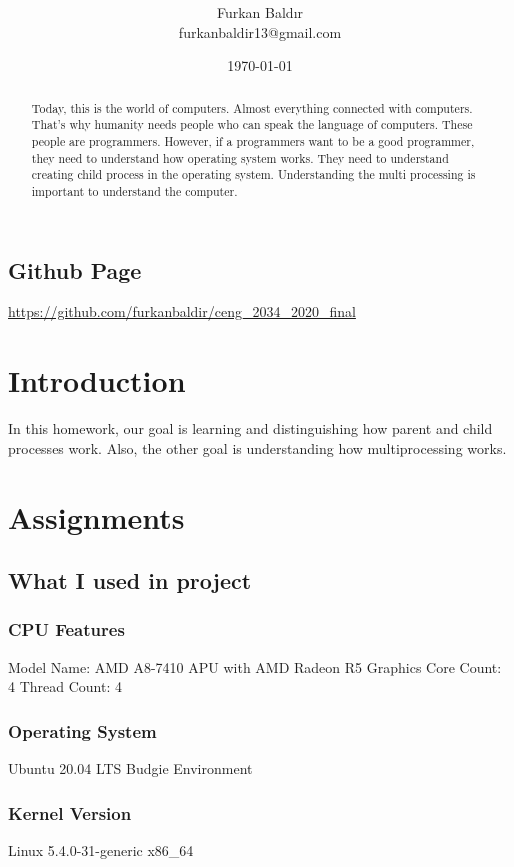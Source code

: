 \documentclass[]{article}
\title{\spacecaps{Assignment Report 2: Multi Processing Implementation}\\ \normalsize \spacesc{CENG2034, Operating Systems} }
\author{Furkan Baldır\\furkanbaldir13@gmail.com}
\date{\today}
\begin{document}
\maketitle

\begin{abstract}
	Today, this is the world of computers. Almost everything connected with computers. That's why humanity needs people who can speak the language of computers. These people are programmers.  However, if a programmers want to be a good programmer, they need to understand how operating system works. They need to understand creating child process in the operating system. Understanding the multi processing is important to understand the computer.
\end{abstract}

\subsection*{Github Page}
\url{https://github.com/furkanbaldir/ceng_2034_2020_final} 

\section{Introduction}
In this homework, our goal is learning and distinguishing how parent and child processes work. Also, the other goal is understanding how multiprocessing works. 
\section{Assignments}

\subsection{What I used in project}

\subsubsection*{CPU Features}
Model Name: AMD A8-7410 APU with AMD Radeon R5 Graphics\newline
Core Count: 4\newline
Thread Count: 4
\subsubsection*{Operating System}
Ubuntu 20.04 LTS Budgie Environment
\subsubsection*{Kernel Version}
Linux 5.4.0-31-generic x86\_64
\end{document}
